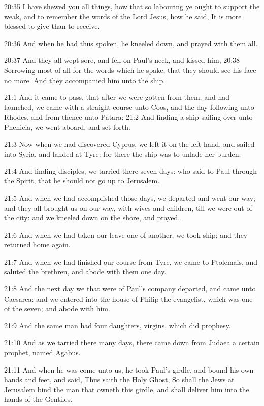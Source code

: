 20:35 I have shewed you all things, how that so labouring ye ought to
support the weak, and to remember the words of the Lord Jesus, how he
said, It is more blessed to give than to receive.

20:36 And when he had thus spoken, he kneeled down, and prayed with
them all.

20:37 And they all wept sore, and fell on Paul's neck, and kissed him,
20:38 Sorrowing most of all for the words which he spake, that they
should see his face no more. And they accompanied him unto the ship.

21:1 And it came to pass, that after we were gotten from them, and had
launched, we came with a straight course unto Coos, and the day
following unto Rhodes, and from thence unto Patara: 21:2 And finding a
ship sailing over unto Phenicia, we went aboard, and set forth.

21:3 Now when we had discovered Cyprus, we left it on the left hand,
and sailed into Syria, and landed at Tyre: for there the ship was to
unlade her burden.

21:4 And finding disciples, we tarried there seven days: who said to
Paul through the Spirit, that he should not go up to Jerusalem.

21:5 And when we had accomplished those days, we departed and went our
way; and they all brought us on our way, with wives and children, till
we were out of the city: and we kneeled down on the shore, and prayed.

21:6 And when we had taken our leave one of another, we took ship; and
they returned home again.

21:7 And when we had finished our course from Tyre, we came to
Ptolemais, and saluted the brethren, and abode with them one day.

21:8 And the next day we that were of Paul's company departed, and
came unto Caesarea: and we entered into the house of Philip the
evangelist, which was one of the seven; and abode with him.

21:9 And the same man had four daughters, virgins, which did prophesy.

21:10 And as we tarried there many days, there came down from Judaea a
certain prophet, named Agabus.

21:11 And when he was come unto us, he took Paul's girdle, and bound
his own hands and feet, and said, Thus saith the Holy Ghost, So shall
the Jews at Jerusalem bind the man that owneth this girdle, and shall
deliver him into the hands of the Gentiles.

